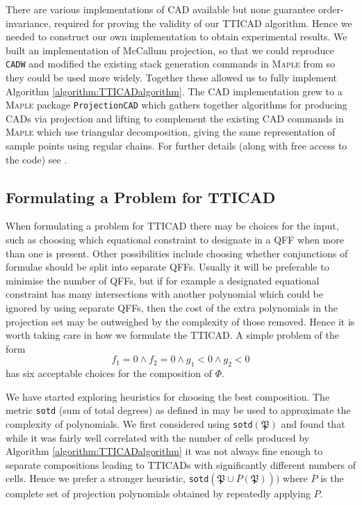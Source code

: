 \documentclass{article}
\begin{document}
There are various implementations of CAD available but none guarantee order-invariance, required for proving the validity of our TTICAD algorithm.  
Hence we needed to construct our own implementation to obtain experimental results.  We built an implementation of McCallum projection, so that we could reproduce {\tt CADW} and modified the existing stack generation commands in \textsc{Maple} from \cite{Chenetal2009d} so they could be used more widely.  Together these allowed us to fully implement Algorithm \ref{algorithm:TTICADalgorithm}.  The CAD implementation grew to a \textsc{Maple} package \texttt{ProjectionCAD} which gathers together algorithms for producing CADs via projection and lifting to complement the existing CAD commands in \textsc{Maple} which use triangular decomposition, giving the same representation of sample points using regular chains.  For further details (along with free access to the code) see \cite{ProjectionCAD}.



\subsection{Formulating a Problem for TTICAD} 
\label{subsection:heuristic}

When formulating a problem for TTICAD there may be choices for the input, such as choosing which equational constraint to designate in a QFF when more than one is present.  Other possibilities include choosing whether conjunctions of formulae should be split into separate QFFs.  Usually it will be preferable to minimise the number of QFFs, but if for example a designated equational constraint has many intersections with another polynomial which could be ignored by using separate QFFs, then the cost of the extra polynomials in the projection set may be outweighed by the complexity of those removed.  
Hence it is worth taking care in how we formulate the TTICAD.  
A simple problem of the form
\[
f_1 = 0 \land f_2 = 0 \land g_1 < 0 \land g_2 < 0
\]
has six acceptable choices for the composition of $\Phi$.

We have started exploring heuristics for choosing the best composition. The metric  {\tt sotd} (sum of total degrees) as defined in \cite{Dolzmannetal2004a} may be used to approximate the complexity of polynomials. 
We first considered using \texttt{sotd}$(\mathfrak{P})$ and found that while it was fairly well correlated with the number of cells produced by Algorithm \ref{algorithm:TTICADalgorithm} it was not always fine enough to separate compositions leading to TTICADs with significantly different numbers of cells.  Hence we prefer a stronger heuristic, \texttt{sotd}$(\mathfrak{P} \cup \overline{P}(\mathfrak{P}) ))$ where $\overline{P}$ is the complete set of projection polynomials obtained by repeatedly applying $P$.  
\end{document}
